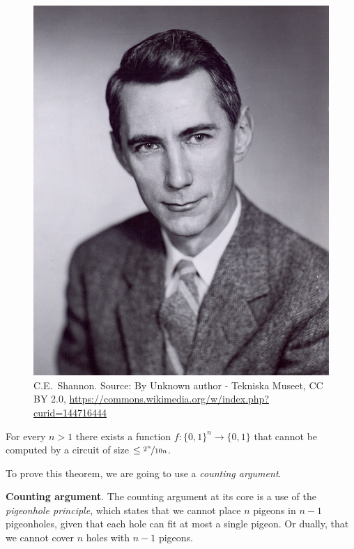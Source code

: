 \begin{figure}
    \centering
    \includegraphics[width=0.25\linewidth]{images/Shannon.jpg}
    \caption{\scriptsize C.E.~Shannon. Source: By Unknown author - Tekniska Museet, CC BY 2.0, \url{https://commons.wikimedia.org/w/index.php?curid=144716444}}
    \label{Claude Shannon}
\end{figure}






\begin{theorem}
    For every $n>1$ there exists a function $f:\{0,1\}^n \rightarrow\{0,1\}$ that cannot be computed by a circuit of size  $\le \nicefrac{2^n}{10 n}$.
\end{theorem}


To prove this theorem, we are going to use a \emph{counting argument}. 
\begin{svgraybox}
\textbf{Counting argument}. The counting argument at its core is a use of the \emph{pigeonhole principle}, which states that we cannot place $n$ pigeons in $n-1$ pigeonholes, given that each hole can fit at most a single pigeon. Or dually, that we cannot cover $n$ holes with $n-1$ pigeons. 
\end{svgraybox}


